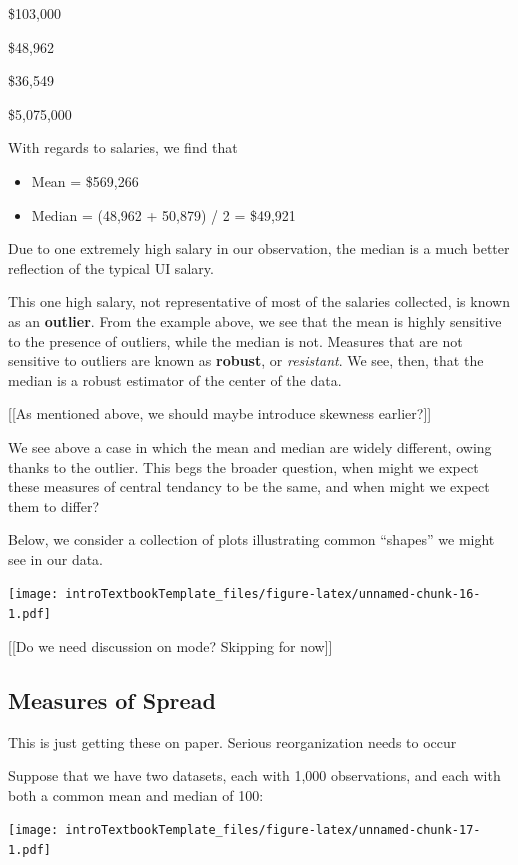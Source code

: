\documentclass[
]{book}
\providecommand{\tightlist}{%
  \setlength{\itemsep}{0pt}\setlength{\parskip}{0pt}}
\theoremstyle{definition}
\theoremstyle{definition}
\theoremstyle{definition}
\theoremstyle{remark}
\begin{document}
\$103,000

\$48,962

\$36,549

\$5,075,000

With regards to salaries, we find that

\begin{itemize}
\tightlist
\item
  Mean = \$569,266
\item
  Median = (48,962 + 50,879) / 2 = \$49,921
\end{itemize}

Due to one extremely high salary in our observation, the median is a much better reflection of the typical UI salary.

This one high salary, not representative of most of the salaries collected, is known as an \textbf{outlier}. From the example above, we see that the mean is highly sensitive to the presence of outliers, while the median is not. Measures that are not sensitive to outliers are known as \textbf{robust}, or \emph{resistant}. We see, then, that the median is a robust estimator of the center of the data.

{[}{[}As mentioned above, we should maybe introduce skewness earlier?{]}{]}

We see above a case in which the mean and median are widely different, owing thanks to the outlier. This begs the broader question, when might we expect these measures of central tendancy to be the same, and when might we expect them to differ?

Below, we consider a collection of plots illustrating common ``shapes'' we might see in our data.

\texttt{[image: introTextbookTemplate\_files/figure-latex/unnamed-chunk-16-1.pdf]}

{[}{[}Do we need discussion on mode? Skipping for now{]}{]}

\hypertarget{measures-of-spread}{%
\subsection{Measures of Spread}\label{measures-of-spread}}

This is just getting these on paper. Serious reorganization needs to occur

Suppose that we have two datasets, each with 1,000 observations, and each with both a common mean and median of 100:

\texttt{[image: introTextbookTemplate\_files/figure-latex/unnamed-chunk-17-1.pdf]}
\end{document}
